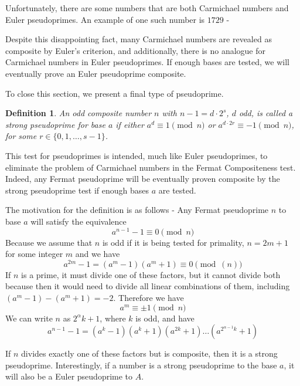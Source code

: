 \documentclass{article}
\newtheorem*{definition}{Definition}
\begin{document}
Unfortunately, there are some numbers that are both Carmichael numbers and Euler pseudoprimes. An example of one such number is $1729$ - %
\par Despite this disappointing fact,  many Carmichael numbers are revealed as composite by Euler's criterion, and additionally, there is no analogue for Carmichael numbers in Euler pseudoprimes. If enough bases are tested, we will eventually prove an Euler pseudoprime composite.

\par To close this section, we present a final type of pseudoprime.
\begin{definition}
An odd composite number $n$ with $n-1 = d\cdot2^s$, $d$ odd, is called a \textit{strong pseudoprime} for base $a$ if either
$a^d \equiv 1 \pmod n$ or $a^{d \cdot 2r} \equiv -1 \pmod n$, for some $r \in \{0, 1, \ldots, s-1\}$. 
\end{definition}

\par This test for pseudoprimes is intended, much like Euler pseudoprimes, to eliminate the problem of Carmichael numbers in the Fermat
Compositeness test. Indeed, any Fermat pseudoprime will be eventually proven composite by the strong pseudoprime test if enough 
bases $a$ are tested.

\par The motivation for the definition is as follows - Any Fermat pseudoprime $n$ to base $a$ will satisfy the equivalence
	$$a^{n-1} - 1 \equiv 0 \pmod n$$
Because we assume that $n$ is odd if it is being tested for primality, $n = 2m+1$ for some integer $m$ and we have
	$$a^{2m} - 1 = (a^m - 1)(a^m+1) \equiv 0 \pmod(n)$$
If $n$ is a prime, it must divide one of these factors, but it cannot divide both because then it would need to divide all linear
combinations of them, including $(a^m - 1) - (a^m + 1) = -2$. Therefore we have 
	$$a^m \equiv \pm 1 \pmod n$$
We can write $n$ as $2^\alpha k + 1$, where $k$ is odd, and have 
	$$a^{n-1} - 1 = (a^k - 1)(a^k + 1)(a^{2k} + 1) \ldots (a^{2^{\alpha - 1} k} +1)$$
	
\par If $n$ divides exactly one of these factors but is composite, then it is a strong pseudoprime. Interestingly, if a number is
a strong pseudoprime to the base $a$, it will also be a Euler pseudoprime to $A$.





\end{document}
